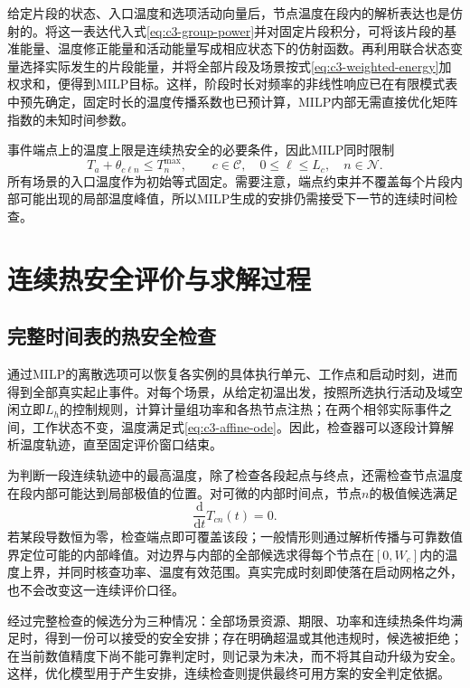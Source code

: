 给定片段的状态、入口温度和选项活动向量后，节点温度在段内的解析表达也是仿射的。将这一表达代入式\eqref{eq:c3-group-power}并对固定片段积分，可将该片段的基准能量、温度修正能量和活动能量写成相应状态下的仿射函数。再利用联合状态变量选择实际发生的片段能量，并将全部片段及场景按式\eqref{eq:c3-weighted-energy}加权求和，便得到MILP目标。这样，阶段时长对频率的非线性响应已在有限模式表中预先确定，固定时长的温度传播系数也已预计算，MILP内部无需直接优化矩阵指数的未知时间参数。

事件端点上的温度上限是连续热安全的必要条件，因此MILP同时限制
\begin{equation}
 T_a+\theta_{c\ell n}\le T_n^{\max},
 \qquad c\in\mathcal C,\quad 0\le\ell\le L_c,\quad n\in\mathcal N.
 \label{eq:c3-endpoint}
\end{equation}
所有场景的入口温度作为初始等式固定。需要注意，端点约束并不覆盖每个片段内部可能出现的局部温度峰值，所以MILP生成的安排仍需接受下一节的连续时间检查。

\section{连续热安全评价与求解过程}

\subsection{完整时间表的热安全检查}

通过MILP的离散选项可以恢复各实例的具体执行单元、工作点和启动时刻，进而得到全部真实起止事件。对每个场景，从给定初温出发，按照所选执行活动及域空闲立即$L_h$的控制规则，计算计量组功率和各热节点注热；在两个相邻实际事件之间，工作状态不变，温度满足式\eqref{eq:c3-affine-ode}。因此，检查器可以逐段计算解析温度轨迹，直至固定评价窗口结束。

为判断一段连续轨迹中的最高温度，除了检查各段起点与终点，还需检查节点温度在段内部可能达到局部极值的位置。对可微的内部时间点，节点$n$的极值候选满足
\begin{equation}
 \frac{\mathrm d}{\mathrm dt}T_{cn}(t)=0.
 \label{eq:c3-stationary}
\end{equation}
若某段导数恒为零，检查端点即可覆盖该段；一般情形则通过解析传播与可靠数值界定位可能的内部峰值。对边界与内部的全部候选求得每个节点在$[0,W_c]$内的温度上界，并同时核查功率、温度有效范围。真实完成时刻即使落在启动网格之外，也不会改变这一连续评价口径。

经过完整检查的候选分为三种情况：全部场景资源、期限、功率和连续热条件均满足时，得到一份可以接受的安全安排；存在明确超温或其他违规时，候选被拒绝；在当前数值精度下尚不能可靠判定时，则记录为未决，而不将其自动升级为安全。这样，优化模型用于产生安排，连续检查则提供最终可用方案的安全判定依据。

